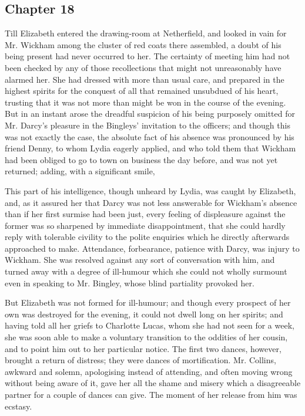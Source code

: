 \subsection[chapter-18]{\useURL[url18][][][]\from[url18] Chapter 18}

Till Elizabeth entered the drawing-room at Netherfield, and looked in vain for Mr. Wickham among the cluster of red coats there assembled, a doubt of his being present had never occurred to her. The certainty of meeting him had not been checked by any of those recollections that might not unreasonably have alarmed her. She had dressed with more than usual care, and prepared in the highest spirits for the conquest of all that remained unsubdued of his heart, trusting that it was not more than might be won in the course of the evening. But in an instant arose the dreadful suspicion of his being purposely omitted for Mr. Darcy's pleasure in the Bingleys' invitation to the officers; and though this was not exactly the case, the absolute fact of his absence was pronounced by his friend Denny, to whom Lydia eagerly applied, and who told them that Wickham had been obliged to go to town on business the day before, and was not yet returned; adding, with a significant smile, 

This part of his intelligence, though unheard by Lydia, was caught by Elizabeth, and, as it assured her that Darcy was not less answerable for Wickham's absence than if her first surmise had been just, every feeling of displeasure against the former was so sharpened by immediate disappointment, that she could hardly reply with tolerable civility to the polite enquiries which he directly afterwards approached to make. Attendance, forbearance, patience with Darcy, was injury to Wickham. She was resolved against any sort of conversation with him, and turned away with a degree of ill-humour which she could not wholly surmount even in speaking to Mr. Bingley, whose blind partiality provoked her.

But Elizabeth was not formed for ill-humour; and though every prospect of her own was destroyed for the evening, it could not dwell long on her spirits; and having told all her griefs to Charlotte Lucas, whom she had not seen for a week, she was soon able to make a voluntary transition to the oddities of her cousin, and to point him out to her particular notice. The first two dances, however, brought a return of distress; they were dances of mortification. Mr. Collins, awkward and solemn, apologising instead of attending, and often moving wrong without being aware of it, gave her all the shame and misery which a disagreeable partner for a couple of dances can give. The moment of her release from him was ecstasy.

